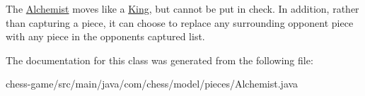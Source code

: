The \mbox{\hyperlink{classcom_1_1chess_1_1model_1_1pieces_1_1_alchemist}{Alchemist}} moves like a \mbox{\hyperlink{classcom_1_1chess_1_1model_1_1pieces_1_1_king}{King}}, but cannot be put in check. In addition, rather than capturing a piece, it can choose to replace any surrounding opponent piece with any piece in the opponent\textquotesingle{}s captured list. 

The documentation for this class was generated from the following file\+:\begin{DoxyCompactItemize}
\item 
chess-\/game/src/main/java/com/chess/model/pieces/Alchemist.\+java\end{DoxyCompactItemize}
